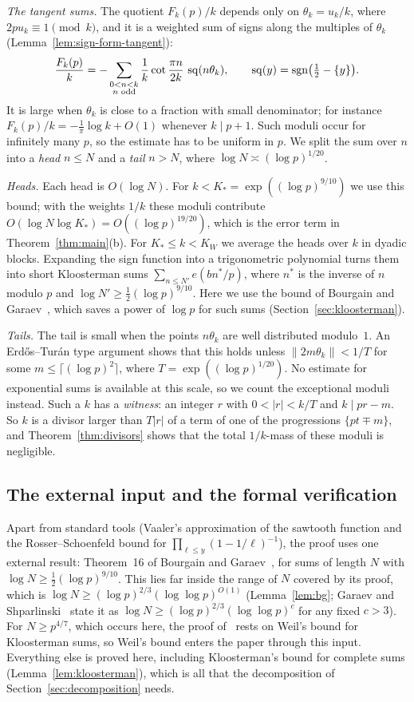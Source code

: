 \emph{The tangent sums.} The quotient $F_k(p)/k$ depends only on $\theta_k=u_k/k$, where $2pu_k\equiv1\pmod k$, and it is a weighted sum of signs along the multiples of $\theta_k$ (Lemma~\ref{lem:sign-form-tangent}):
\[
\frac{F_k(p)}k=-\sum_{\substack{0<n<k\\ n\text{ odd}}}\frac1k\cot\frac{\pi n}{2k}\,\operatorname{sq}(n\theta_k),\qquad \operatorname{sq}(y)=\operatorname{sgn}\bigl(\tfrac12-\{y\}\bigr).
\]
It is large when $\theta_k$ is close to a fraction with small denominator; for instance $F_k(p)/k=-\frac1\pi\log k+O(1)$ whenever $k\mid p+1$. Such moduli occur for infinitely many $p$, so the estimate has to be uniform in $p$. We split the sum over $n$ into a \emph{head} $n\le N$ and a \emph{tail} $n>N$, where $\log N\asymp(\log p)^{1/20}$.

\emph{Heads.} Each head is $O(\log N)$. For $k<K_*=\exp((\log p)^{9/10})$ we use this bound; with the weights $1/k$ these moduli contribute $O(\log N\log K_*)=O((\log p)^{19/20})$, which is the error term in Theorem~\ref{thm:main}(b). For $K_*\le k<K_W$ we average the heads over $k$ in dyadic blocks. Expanding the sign function into a trigonometric polynomial turns them into short Kloosterman sums $\sum_{n\le N'}e(bn^*/p)$, where $n^*$ is the inverse of $n$ modulo $p$ and $\log N'\ge\frac12(\log p)^{9/10}$. Here we use the bound of Bourgain and Garaev~\cite[Theorem~16]{b8}, which saves a power of $\log p$ for such sums (Section~\ref{sec:kloosterman}).

\emph{Tails.} The tail is small when the points $n\theta_k$ are well distributed modulo~$1$. An Erd\H{o}s--Tur\'an type argument shows that this holds unless $\|2m\theta_k\|<1/T$ for some $m\le\lceil(\log p)^2\rceil$, where $T=\exp((\log p)^{1/20})$. No estimate for exponential sums is available at this scale, so we count the exceptional moduli instead. Such a $k$ has a \emph{witness}: an integer $r$ with $0<|r|<k/T$ and $k\mid pr-m$. So $k$ is a divisor larger than $T|r|$ of a term of one of the progressions $\{pt\mp m\}$, and Theorem~\ref{thm:divisors} shows that the total $1/k$-mass of these moduli is negligible.

\subsection{The external input and the formal verification}
Apart from standard tools (Vaaler's approximation of the sawtooth function and the Rosser--Schoenfeld bound for $\prod_{\ell\le y}(1-1/\ell)^{-1}$), the proof uses one external result: Theorem~16 of Bourgain and Garaev~\cite{b8}, for sums of length $N$ with $\log N\ge\frac12(\log p)^{9/10}$. This lies far inside the range of $N$ covered by its proof, which is $\log N\ge(\log p)^{2/3}(\log\log p)^{O(1)}$ (Lemma~\ref{lem:bg}; Garaev and Shparlinski~\cite[(1.2)]{b12} state it as $\log N\ge(\log p)^{2/3}(\log\log p)^{c}$ for any fixed $c>3$). For $N\ge p^{4/7}$, which occurs here, the proof of~\cite[Theorem~16]{b8} rests on Weil's bound for Kloosterman sums, so Weil's bound enters the paper through this input. Everything else is proved here, including Kloosterman's bound for complete sums (Lemma~\ref{lem:kloosterman}), which is all that the decomposition of Section~\ref{sec:decomposition} needs.

